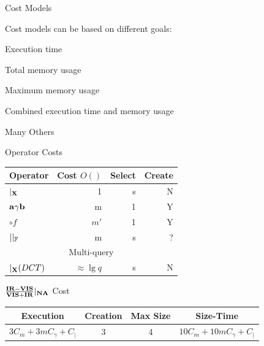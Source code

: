 \documentclass[final,total,bgColor,slideColor,pdf,ps2pdf,default,noaccumulate]{prosper}
\begin{document}
\begin{slide}{Cost Models}

Cost models can be based on different goals:

\begin{Itemize}
\item Execution time %
\item Total memory usage %
\item Maximum memory usage %
\item Combined execution time and memory usage %
\item Many Others
\end{Itemize}  
\end{slide}

\begin{slide}{Operator Costs}
  \centering
  \begin{tabular}{l|r|r|r}
    Operator & Cost $O()$ & Select & Create \\
    \hline \hline
    $|_{\bf{X}}$ & 1 & s & N \\ 
    ${\bf{a}}\gamma{\ensuremath{\bf{b}}}$ & m & 1 & Y \\
    $\circ f$ & $m'$ & 1 & Y \\    
    $||_{\mathbb{F}}$ & m & s & ? \\ 
    \hline
    \multicolumn{4}{c}{Multi-query} \\
    \hline
    $|_{\bf{X}} (DCT) $ & $\approx \lg{q}$ & s & N \\ 
  \end{tabular}  
\end{slide}

\begin{slide}{$\frac{{\bf{IR}}-{\bf{VIS}}}{{\bf{VIS}}+{\bf{IR}}}|_{{\bf{NA}}}$ Cost}
  \centering
  

  \vspace*{0.5cm}
  {\fontsize{8}{8}\selectfont
    \begin{tabular}{c|c|c|c}
      Execution & Creation & Max Size & Size-Time \\
      \hline \hline
      $3 C_{m} + 3 m C_{\gamma} + C_{|}$ & 3 & 4 & $10 C_{m} + 10 m C_{\gamma} + C_{|}$ \\
  \end{tabular}
  }
\end{slide}
\end{document}
